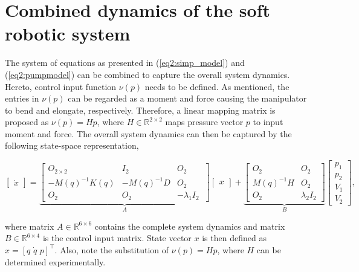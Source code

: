 {\section{Combined dynamics of the soft robotic system}




The system of equations as presented in (\ref{eq2:simp_model}) and (\ref{eq2:pumpmodel}) can be combined to capture the overall system dynamics. Hereto, control input function $\nu(p)$ needs to be defined. As mentioned, the entries in $\nu(p)$ can be regarded as a moment and force causing the manipulator to bend and elongate, respectively. Therefore, a linear mapping matrix is proposed as $\nu(p) = H p$, where $H \in \mathbb{R}^{2\times 2}$ maps pressure vector $p$ to input moment and force. The overall system dynamics can then be captured by the following state-space representation,

\begin{equation}
     \begin{bmatrix} \dot{x}  \end{bmatrix}   =   \underbrace{ \begin{bmatrix} O_{2\times 2} & I_{2} & O_{2} \\ -M(q)^{-1}K(q)  & -M(q)^{-1} D & O_{2} \\
     O_{2} & O_{2}    & -\lambda_1 I_{2}\ \end{bmatrix}   }_A   \begin{bmatrix} x \end{bmatrix}  + \underbrace{      \begin{bmatrix} O_{2} & O_{2} \\ M(q)^{-1}H & O_{2} \\ O_{2} & \lambda_2 I_{2} \end{bmatrix} }_B      \begin{bmatrix} p_1 \\ p_2  \\ V_1 \\ V_2 \end{bmatrix},
     \label{eq:ssp}
\end{equation}

where matrix $A \in \mathbb{R}^{6\times 6}$ contains the complete system dynamics and matrix $B \in \mathbb{R}^{6\times 4}$ is the control input matrix. State vector $x$ is then defined as $x = [q \hspace{4pt} \dot{q} \hspace{4pt} p]^\top$. Also, note the substitution of $\nu(p) = Hp$, where $H$ can be determined experimentally. 



}
